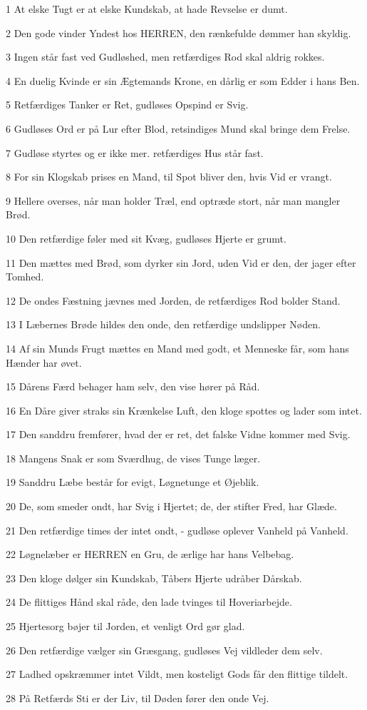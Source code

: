 \par 1 At elske Tugt er at elske Kundskab, at hade Revselse er dumt.
\par 2 Den gode vinder Yndest hos HERREN, den rænkefulde dømmer han skyldig.
\par 3 Ingen står fast ved Gudløshed, men retfærdiges Rod skal aldrig rokkes.
\par 4 En duelig Kvinde er sin Ægtemands Krone, en dårlig er som Edder i hans Ben.
\par 5 Retfærdiges Tanker er Ret, gudløses Opspind er Svig.
\par 6 Gudløses Ord er på Lur efter Blod, retsindiges Mund skal bringe dem Frelse.
\par 7 Gudløse styrtes og er ikke mer. retfærdiges Hus står fast.
\par 8 For sin Klogskab prises en Mand, til Spot bliver den, hvis Vid er vrangt.
\par 9 Hellere overses, når man holder Træl, end optræde stort, når man mangler Brød.
\par 10 Den retfærdige føler med sit Kvæg, gudløses Hjerte er grumt.
\par 11 Den mættes med Brød, som dyrker sin Jord, uden Vid er den, der jager efter Tomhed.
\par 12 De ondes Fæstning jævnes med Jorden, de retfærdiges Rod bolder Stand.
\par 13 I Læbernes Brøde hildes den onde, den retfærdige undslipper Nøden.
\par 14 Af sin Munds Frugt mættes en Mand med godt, et Menneske får, som hans Hænder har øvet.
\par 15 Dårens Færd behager ham selv, den vise hører på Råd.
\par 16 En Dåre giver straks sin Krænkelse Luft, den kloge spottes og lader som intet.
\par 17 Den sanddru fremfører, hvad der er ret, det falske Vidne kommer med Svig.
\par 18 Mangens Snak er som Sværdhug, de vises Tunge læger.
\par 19 Sanddru Læbe består for evigt, Løgnetunge et Øjeblik.
\par 20 De, som smeder ondt, har Svig i Hjertet; de, der stifter Fred, har Glæde.
\par 21 Den retfærdige times der intet ondt, - gudløse oplever Vanheld på Vanheld.
\par 22 Løgnelæber er HERREN en Gru, de ærlige har hans Velbebag.
\par 23 Den kloge dølger sin Kundskab, Tåbers Hjerte udråber Dårskab.
\par 24 De flittiges Hånd skal råde, den lade tvinges til Hoveriarbejde.
\par 25 Hjertesorg bøjer til Jorden, et venligt Ord gør glad.
\par 26 Den retfærdige vælger sin Græsgang, gudløses Vej vildleder dem selv.
\par 27 Ladhed opskræmmer intet Vildt, men kosteligt Gods får den flittige tildelt.
\par 28 På Retfærds Sti er der Liv, til Døden fører den onde Vej.

